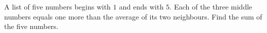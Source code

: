 A list of five numbers begins with $1$ and ends with $5$. Each of the three middle numbers equals one more than the average of its two neighbours. Find the sum of the five numbers.
